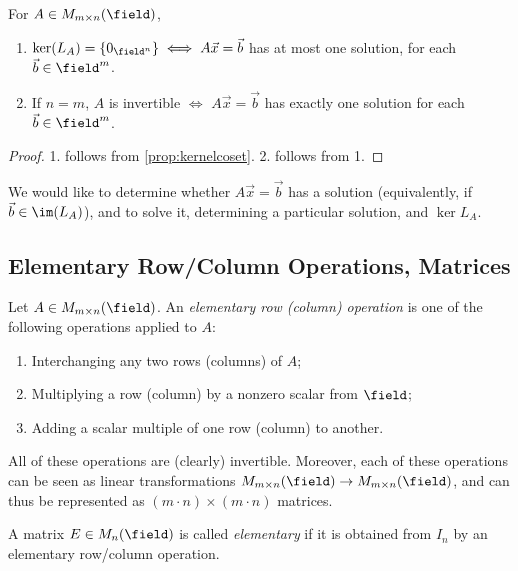 \begin{corollary}
    For $A \in M_{m \times n}(\field)$,
    \begin{enumerate}
        \item $\ker(L_A) = \{0_{\field^n}\} \iff A \vec{x} = \vec{b}$ has at most one solution, for each $\vec{b} \in \field^m$.
        \item If $n = m$, $A$ is invertible $\iff$ $A \vec{x} = \vec{b}$ has exactly one solution for each $\vec{b} \in \field^m$.
    \end{enumerate}
\end{corollary}

\begin{proof}
    1. follows from \cref{prop:kernelcoset}. 2. follows from 1.
\end{proof}

We would like to determine whether $A \vec{x} = \vec{b}$ has a solution (equivalently, if $\vec{b} \in \im(L_A)$), and to solve it, determining a particular solution, and $\ker{L_A}$.

\subsection{Elementary Row/Column Operations, Matrices}

\begin{definition}
    Let $A \in M_{m \times n}(\field)$. An \emph{elementary row (column) operation} is one of the following operations applied to $A$:
    \begin{enumerate}
        \item Interchanging any two rows (columns) of $A$;
        \item Multiplying a row (column) by a nonzero scalar from $\field$;
        \item Adding a scalar multiple of one row (column) to another.
    \end{enumerate}
\end{definition}

\begin{remark}
    All of these operations are (clearly) invertible. Moreover, each of these operations can be seen as linear transformations $M_{m \times n}(\field) \to M_{m \times n}(\field)$, and can thus be represented as $(m \cdot n) \times (m \cdot n)$ matrices.
\end{remark}

\begin{definition}
    A matrix $E \in M_{n}(\field)$ is called \emph{elementary} if it is obtained from $I_n$ by an elementary row/column operation.
\end{definition}

